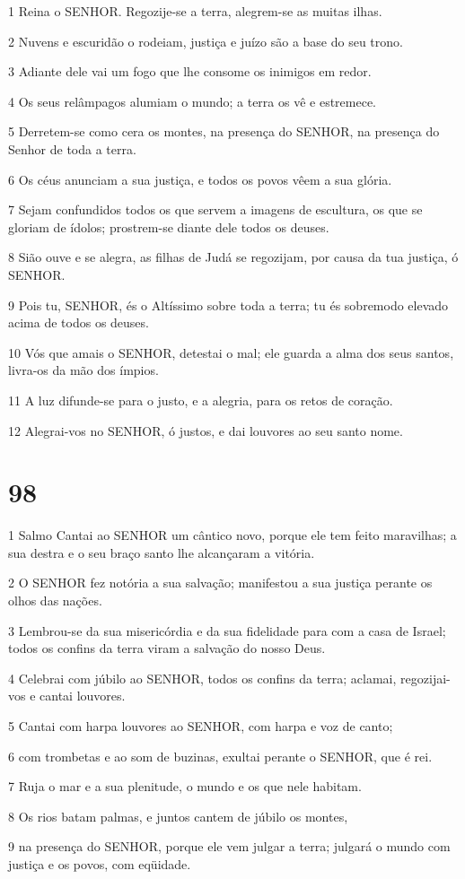 \par 1 Reina o SENHOR. Regozije-se a terra, alegrem-se as muitas ilhas.
\par 2 Nuvens e escuridão o rodeiam, justiça e juízo são a base do seu trono.
\par 3 Adiante dele vai um fogo que lhe consome os inimigos em redor.
\par 4 Os seus relâmpagos alumiam o mundo; a terra os vê e estremece.
\par 5 Derretem-se como cera os montes, na presença do SENHOR, na presença do Senhor de toda a terra.
\par 6 Os céus anunciam a sua justiça, e todos os povos vêem a sua glória.
\par 7 Sejam confundidos todos os que servem a imagens de escultura, os que se gloriam de ídolos; prostrem-se diante dele todos os deuses.
\par 8 Sião ouve e se alegra, as filhas de Judá se regozijam, por causa da tua justiça, ó SENHOR.
\par 9 Pois tu, SENHOR, és o Altíssimo sobre toda a terra; tu és sobremodo elevado acima de todos os deuses.
\par 10 Vós que amais o SENHOR, detestai o mal; ele guarda a alma dos seus santos, livra-os da mão dos ímpios.
\par 11 A luz difunde-se para o justo, e a alegria, para os retos de coração.
\par 12 Alegrai-vos no SENHOR, ó justos, e dai louvores ao seu santo nome.

\chapter{98}

\par 1 Salmo Cantai ao SENHOR um cântico novo, porque ele tem feito maravilhas; a sua destra e o seu braço santo lhe alcançaram a vitória.
\par 2 O SENHOR fez notória a sua salvação; manifestou a sua justiça perante os olhos das nações.
\par 3 Lembrou-se da sua misericórdia e da sua fidelidade para com a casa de Israel; todos os confins da terra viram a salvação do nosso Deus.
\par 4 Celebrai com júbilo ao SENHOR, todos os confins da terra; aclamai, regozijai-vos e cantai louvores.
\par 5 Cantai com harpa louvores ao SENHOR, com harpa e voz de canto;
\par 6 com trombetas e ao som de buzinas, exultai perante o SENHOR, que é rei.
\par 7 Ruja o mar e a sua plenitude, o mundo e os que nele habitam.
\par 8 Os rios batam palmas, e juntos cantem de júbilo os montes,
\par 9 na presença do SENHOR, porque ele vem julgar a terra; julgará o mundo com justiça e os povos, com eqüidade.

